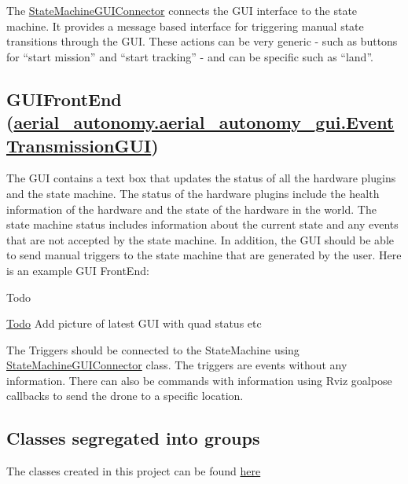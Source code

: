 The \hyperlink{classStateMachineGUIConnector}{State\-Machine\-G\-U\-I\-Connector} connects the G\-U\-I interface to the state machine. It provides a message based interface for triggering manual state transitions through the G\-U\-I. These actions can be very generic -\/ such as buttons for “start mission” and “start tracking” -\/ and can be specific such as “land”.

\subsection*{G\-U\-I\-Front\-End (\hyperlink{classaerial__autonomy_1_1aerial__autonomy__gui_1_1EventTransmissionGUI}{aerial\-\_\-autonomy.\-aerial\-\_\-autonomy\-\_\-gui.\-Event\-Transmission\-G\-U\-I})}

The G\-U\-I contains a text box that updates the status of all the hardware plugins and the state machine. The status of the hardware plugins include the health information of the hardware and the state of the hardware in the world. The state machine status includes information about the current state and any events that are not accepted by the state machine. In addition, the G\-U\-I should be able to send manual triggers to the state machine that are generated by the user. Here is an example G\-U\-I Front\-End\-:

\begin{DoxyRefDesc}{Todo}
\item[\hyperlink{todo__todo000014}{Todo}]Add picture of latest G\-U\-I with quad status etc\end{DoxyRefDesc}


The Triggers should be connected to the {\ttfamily State\-Machine} using {\ttfamily \hyperlink{classStateMachineGUIConnector}{State\-Machine\-G\-U\-I\-Connector}} class. The triggers are events without any information. There can also be commands with information using {\ttfamily Rviz} goalpose callbacks to send the drone to a specific location.

\subsection*{Classes segregated into groups}

The classes created in this project can be found \hyperlink{md_markdown_scripts_class_groups}{here} 